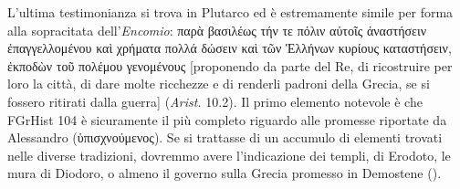 {    L'ultima testimonianza si trova in Plutarco ed è estremamente simile per forma alla sopracitata dell'\emph{Encomio}: \textgreek{παρὰ βασιλέως τήν τε πόλιν αὐτοῖς ἀναστήσειν ἐπαγγελλομένου καὶ χρήματα πολλά δώσειν καὶ τῶν Ἑλλήνων κυρίους καταστήσειν, ἐκποδὼν τοῦ πολέμου γενομένους} [proponendo da parte del Re, di ricostruire per loro la città, di dare molte ricchezze e di renderli padroni della Grecia, se si fossero ritirati dalla guerra] (\emph{Arist. }10.2). 
    Il primo elemento notevole è che FGrHist 104 è sicuramente il più completo riguardo alle promesse riportate da Alessandro (\textgreek{ὑπισχνούμενος}). Se si trattasse di un accumulo di elementi trovati nelle diverse tradizioni, dovremmo avere l'indicazione dei templi, di Erodoto, le mura di Diodoro, o almeno il governo sulla Grecia promesso in Demostene (\cite[78]{Schepens2007}).
}
